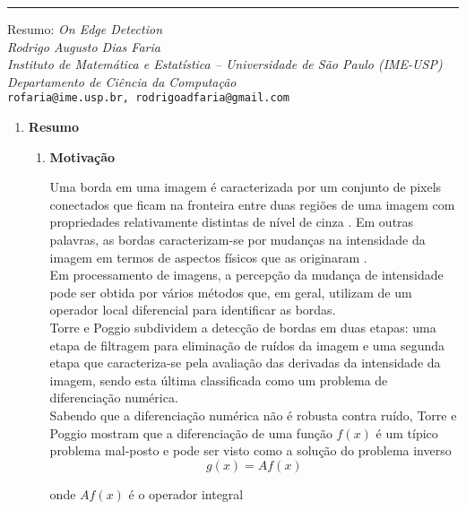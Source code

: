 \clearpage
\noindent\rule{14.5cm}{0.4pt}

\begin{center}
    {\Large Resumo: \textit{On Edge Detection}}
    \\[8pt]
    
    \textit{Rodrigo Augusto Dias Faria}
    \\[8pt]
    
    \textit{Instituto de Matemática e Estatística -- Universidade de São Paulo (IME-USP)\\
    Departamento de Ciência da Computação
    }\\[8pt]
    
    \texttt{rofaria@ime.usp.br, rodrigoadfaria@gmail.com}
\end{center}

\begin{enumerate}
\item \textbf{Resumo}
\begin{enumerate}[label*=\arabic*.]
    \item \textbf{Motivação}
    
    Uma borda em uma imagem é caracterizada por um conjunto de pixels conectados que ficam na fronteira entre duas regiões de uma imagem com propriedades relativamente distintas de nível de cinza \cite{gonzalez2002digital}. Em outras palavras, as bordas caracterizam-se por mudanças na intensidade da imagem em termos de aspectos físicos que as originaram \cite{Torre-1986}.
    \\[6pt]
    Em processamento de imagens, a percepção da mudança de intensidade pode ser obtida por vários métodos que, em geral, utilizam de um operador local diferencial para identificar as bordas.
    \\[6pt]
    Torre e Poggio subdividem a detecção de bordas em duas etapas: uma etapa de filtragem para eliminação de ruídos da imagem  e uma segunda etapa que caracteriza-se pela avaliação das derivadas da intensidade da imagem, sendo esta última classificada como um problema de diferenciação numérica.
    \\[6pt]
    Sabendo que a diferenciação numérica não é robusta contra ruído, Torre e Poggio mostram que a diferenciação de uma função $f(x)$ é um típico problema mal-posto e pode ser visto como a solução do problema inverso
\begin{equation} \label{eq:inverse_problem}
   g(x) = A f(x)
\end{equation}

onde $A f(x)$ é o operador integral


\end{enumerate}
\end{enumerate}
